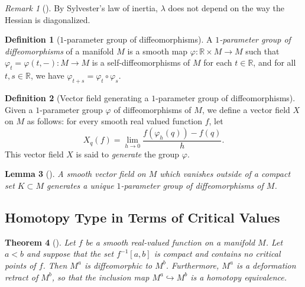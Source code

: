 \documentclass[reqno]{amsart}
\newtheorem{theorem}{Theorem}[section]
\newtheorem{lemma}[theorem]{Lemma}
\theoremstyle{definition}
\newtheorem{definition}[theorem]{Definition}
\theoremstyle{remark}
\newtheorem*{remark}{Remark}
\begin{document}
    \begin{remark}[]
        By Sylvester's law of inertia, 
        $\lambda$ does not depend
        on the way the Hessian is diagonalized.
    \end{remark}

    \begin{definition}[$1$-parameter group of diffeomorphisms]
        A \textit{$1$-parameter group of diffeomorphisms}
        of a manifold $M$ is a smooth map
        $\varphi \colon \mathbb{R} \times M \to M$ such that
        $\varphi_t = \varphi (t,-) \colon M \to M$ is a 
        self-diffeomorphisms of $M$ for each $t \in \mathbb{R}$,
        and for all $t,s \in \mathbb{R}$, we have
        $\varphi_{t+s} = \varphi_t \circ \varphi_s$.
    \end{definition}

    \begin{definition}[Vector field generating a $1$-parameter
        group of diffeomorphisms]
        Given a $1$-parameter group $\varphi $ of diffeomorphisms
        of $M$, we define a vector field $X$ on $M$ as
        follows: for every smooth real valued
        function $f$, let
        \[
        X_q (f) = 
        \lim_{h \to 0} \frac{f\left( \varphi_h(q) \right) -
        f(q)}{h}.
        \] 
        This vector field $X$ is said to \textit{generate} the
        group $\varphi $.
    \end{definition}

    \begin{lemma}[]\label{Lemma:2093128}
        A smooth vector field on $M$ which vanishes
        outside of a compact set $K \subset M$ 
        generates a unique $1$-parameter group of diffeomorphisms
        of $M$.
    \end{lemma}

    \subsection{Homotopy Type in Terms of Critical Values}

    \begin{theorem}[]\label{Thm:203191}
        Let $f$ be a smooth real-valued function on a manifold
        $M$. Let $a < b$ and suppose that the set
        $f^{-1}\left[ a,b \right] $ is compact and contains
        no critical points of $f$. Then $M^{a}$ is diffeomorphic
        to $M^{b}$. Furthermore, $M^{a}$ is a deformation
        retract of $M^{b}$, so that the inclusion map
        $M^{a} \hookrightarrow M^{b}$ is a homotopy equivalence.
    \end{theorem}
\end{document}
